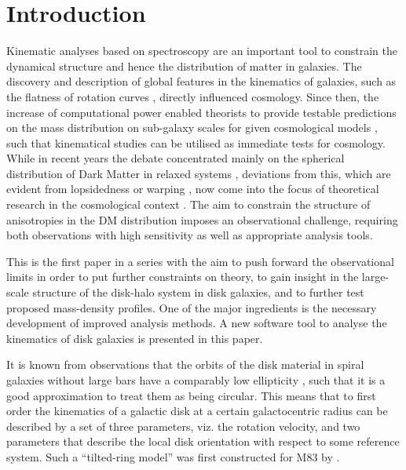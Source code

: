 \documentclass[oldversion]{aa}
\newcommand{\cng}[1]{{#1}}
\begin{document}
\section{Introduction} 
\label{Sect_2.1} 

Kinematic analyses based on spectroscopy are an important tool to constrain
the dynamical structure and hence the distribution of matter in
galaxies. \cng{The d}iscovery and description of global features in the
kinematics of galaxies, such as the flatness of rotation curves
\citep[][]{Rubin70,Bosma78}, directly influenced cosmology.  Since then, the increase of computational power enabled
theorists to provide testable predictions on the mass distribution on
sub-galaxy scales for given cosmological models \citep[e.g. 
][]{Navarro97,Moore99,Reed05}, such that kinematical studies can be
utilised as immediate tests for cosmology.  While in recent years
the debate concentrated mainly on the spherical distribution of Dark
Matter in relaxed systems
\citep[e.g.][]{Swaters03,Blok03,Gentile04,Navarro04a}, deviations from this, 
which are evident from lopsidedness \citep[e.g. 
][]{Schoenmakers97} or warping \citep[e.g.  ][]{Bosma78}, now come into
the focus of theoretical research in the cosmological context
\citep[][]{Sharma05,Gao06}.  The aim to constrain the structure of
anisotropies in the DM distribution imposes an observational challenge,
requiring both observations with high sensitivity as well as
appropriate analysis tools. 

This is the first paper in a series \cng{with the} aim \cng{to} \cng{push} forward the
observational limits in order to put further constraints on theory, 
 to gain insight in the large-scale structure of the disk-halo
system in disk galaxies, and \cng{to} further test proposed
mass-density profiles.  One of the major ingredients is the necessary
development of improved analysis methods.  A new software tool to
analyse the kinematics of disk galaxies is presented in this paper. 

It is known from observations that the orbits of the disk material in
spiral galaxies without large bars have a comparably low ellipticity
\citep[e.g.][]{Bosma81b,Schoenmakers97}, such that it is a good
approximation to treat them as being circular.  This means that to first
order the kinematics of a galactic disk at a certain galactocentric
radius can be described by a set of three parameters, viz.  the
rotation velocity, and two parameters that describe the local disk
orientation with respect to some reference system.  Such a ``tilted-ring
model'' was first constructed for M83 by \citet[][]{Rogstad74}. 
\end{document}
